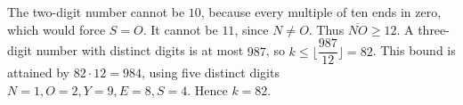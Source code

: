 The two-digit number cannot be $10$, because every multiple of ten ends in zero, which would force $S=O$. It cannot be $11$, since $N\ne O$. Thus $\overline{NO}\ge12$. A three-digit number with distinct digits is at most $987$, so $k\le\lfloor\dfrac{987}{12}\rfloor=82$. This bound is attained by $82\cdot12=984$, using five distinct digits $N=1,O=2,Y=9,E=8,S=4$. Hence $\boxed{k=82}$.
